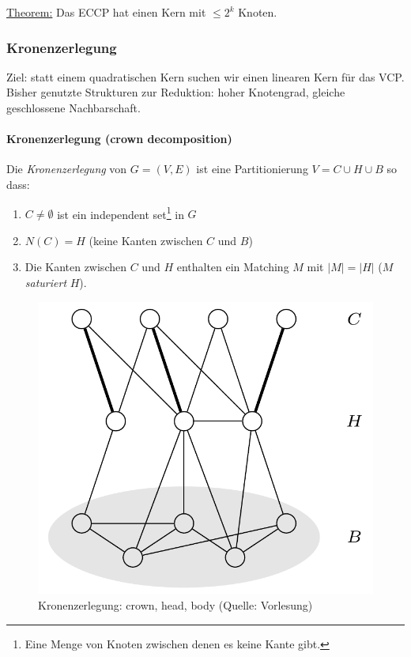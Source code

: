 \underline{Theorem:} Das ECCP hat einen Kern mit $\leq 2^k$ Knoten.


\subsubsection{Kronenzerlegung}

Ziel: statt einem quadratischen Kern suchen wir einen linearen Kern für das VCP. \\
Bisher genutzte Strukturen zur Reduktion: hoher Knotengrad, gleiche geschlossene Nachbarschaft.

\paragraph{Kronenzerlegung (crown decomposition)}
Die \emph{Kronenzerlegung} von $G=(V,E)$ ist eine Partitionierung $V = C \cup H \cup B$ so dass:
\begin{enumerate}[label=(\roman*)]
    \item $C \neq \emptyset$ ist ein independent set\footnote{Eine Menge von Knoten zwischen denen es keine Kante gibt.} in $G$
    \item $N(C) = H$ (keine Kanten zwischen $C$ und $B$)
    \item Die Kanten zwischen $C$ und $H$ enthalten ein Matching $M$ mit $|M| = |H|$ ($M$ \emph{saturiert} $H$).
\end{enumerate}

\begin{figure}[h]
    \centering
    \includegraphics[scale=0.3]{images/crown-decomp.png}
    \caption{Kronenzerlegung: crown, head, body (Quelle: Vorlesung)}
    \label{fig:crown-decomp}
\end{figure}

